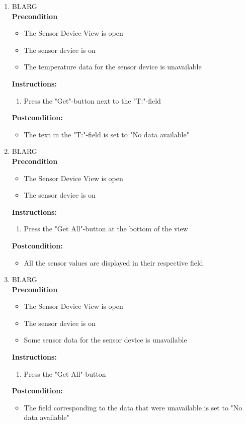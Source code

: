 \documentclass[a4paper]{article}
\newlength{\testlabellength}
\newenvironment{testlist}{\begin{enumerate}[label=\bfseries Instruction \thesubsection.\arabic* , labelindent=0pt, labelwidth=\testlabellength , leftmargin=2cm]}{\end{enumerate}}
\newenvironment{precondition}{
{\color{white}BLARG}\\ 
\textbf{Precondition}
\begin{itemize}[labelindent=0cm, labelwidth=2cm , leftmargin=1cm]
}
{\end{itemize}}
\newenvironment{instruction}{
\textbf{Instructions:}
\begin{enumerate}[label=\bfseries  \arabic*., labelindent=0cm, labelwidth=2cm , leftmargin=1cm]
}
{\end{enumerate}}
\newenvironment{postcondition}{
\textbf{Postcondition:}
\begin{itemize}[labelindent=0cm, labelwidth=2cm , leftmargin=1cm]
}
{\end{itemize}}
\begin{document}
\begin{appendices}
\begin{testlist}
	\item
		\begin{precondition}
			\item The Sensor Device View is open
			\item The sensor device is on
			\item The temperature data for the sensor device is unavailable
		\end{precondition}
		\begin{instruction}
			\item Press the "Get"-button next to the "T:"-field
		\end{instruction}
		\begin{postcondition}
			\item The text in the "T:"-field is set to "No data available"
		\end{postcondition}
        

	\item
		\begin{precondition} 
			\item The Sensor Device View is open
			\item The sensor device is on
		\end{precondition}
		\begin{instruction}
			\item Press the "Get All"-button at the bottom of the view
		\end{instruction}
		\begin{postcondition}
			\item All the sensor values are displayed in their respective field
		\end{postcondition}

	\item
		\begin{precondition}
			\item The Sensor Device View is open
			\item The sensor device is on
    	    \item Some sensor data for the sensor device is unavailable
		\end{precondition}
		\begin{instruction}
			\item Press the "Get All"-button
		\end{instruction}
		\begin{postcondition} 
			\item The field corresponding to the data that were unavailable is set to "No data available"
		\end{postcondition}


\end{testlist}
\end{appendices}
\end{document}
